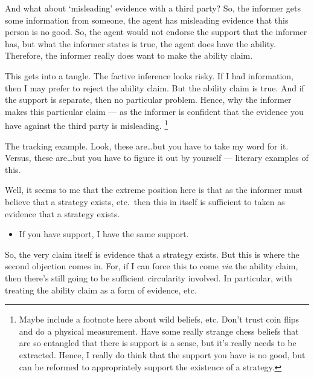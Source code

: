 \documentclass[10pt]{article}
\begin{document}
\begin{note}[Misleading]
  And what about `misleading' evidence with a third party?
  So, the informer gets some information from someone, the agent has misleading evidence that this person is no good.
  So, the agent would not endorse the support that the informer has, but what the informer states is true, the agent does have the ability.
  Therefore, the informer really does want to make the ability claim.

  This gets into a tangle.
  The factive inference looks risky.
  If I had information, then I may prefer to reject the ability claim.
  But the ability claim is true.
  And if the support is separate, then no particular problem.
  Hence, why the informer makes this particular claim --- as the informer is confident that the evidence you have against the third party is misleading.\nolinebreak
  \footnote{
    Maybe include a footnote here about wild beliefs, etc.
    Don't trust coin flips and do a physical measurement.
    Have some really strange chess beliefs that are so entangled that there is support is a sense, but it's really needs to be extracted.
    Hence, I really do think that the support you have is no good, but can be reformed to appropriately support the existence of a strategy.
  }
\end{note}

\begin{note}
  The tracking example.
  Look, these are\dots but you have to take my word for it.
  Versus, these are\dots but you have to figure it out by yourself --- literary examples of this.
\end{note}


\begin{note}
  Well, it seems to me that the extreme position here is that as the informer must believe that a strategy exists, etc.\ then this in itself is sufficient to taken as evidence that a strategy exists.
  \begin{itemize}
  \item If you have support, I have the same support.
  \end{itemize}
  So, the very claim itself is evidence that a strategy exists.
  But this is where the second objection comes in.
  For, if I can force this to come \emph{via} the ability claim, then there's still going to be sufficient circularity involved.
  In particular, with treating the ability claim as a form of evidence, etc.\
\end{note}
\end{document}
